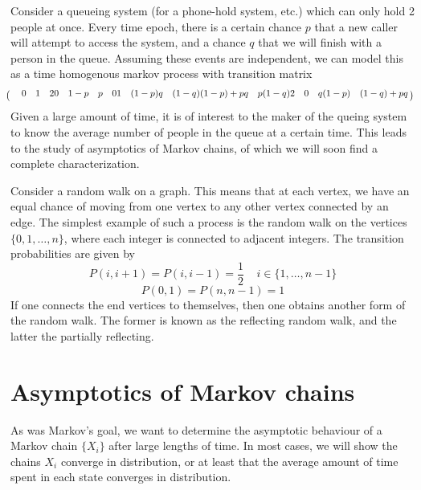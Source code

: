 \begin{example}
    Consider a queueing system (for a phone-hold system, etc.) which can only hold 2 people at once. Every time epoch, there is a certain chance $p$ that a new caller will attempt to access the system, and a chance $q$ that we will finish with a person in the queue. Assuming these events are independent, we can model this as a time homogenous markov process with transition matrix
    \[ \bordermatrix{
    & 0 & 1 & 2 \\
    0 & 1-p & p & 0\\
    1 & (1-p)q & (1 - q)(1 - p) + pq & p(1-q)\\
    2 & 0 & q(1 - p) & (1 - q) + pq }
    \]
    Given a large amount of time, it is of interest to the maker of the queing system to know the average number of people in the queue at a certain time. This leads to the study of asymptotics of Markov chains, of which we will soon find a complete characterization.
\end{example}

\begin{example}
    Consider a random walk on a graph. This means that at each vertex, we have an equal chance of moving from one vertex to any other vertex connected by an edge. The simplest example of such a process is the random walk on the vertices $\{ 0, 1, \dots, n\}$, where each integer is connected to adjacent integers. The transition probabilities are given by
    \[ P(i,i+1) = P(i,i-1) = \frac{1}{2}\ \ \ \ \ i \in \{1, \dots, n-1 \} \]
    \[ P(0,1) = P(n,n-1) = 1 \]
    If one connects the end vertices to themselves, then one obtains another form of the random walk. The former is known as the reflecting random walk, and the latter the partially reflecting.
\end{example}

\section{Asymptotics of Markov chains}

As was Markov's goal, we want to determine the asymptotic behaviour of a Markov chain $\{X_i\}$ after large lengths of time. In most cases, we will show the chains $X_i$ converge in distribution, or at least that the average amount of time spent in each state converges in distribution.


